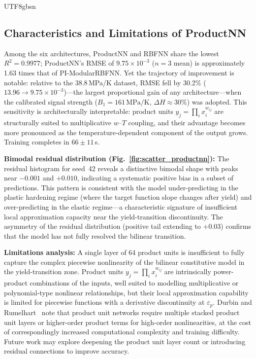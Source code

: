\documentclass[a4paper,12pt]{report}
\begin{document}
\begin{CJK}{UTF8}{gbsn}
\subsection{Characteristics and Limitations of ProductNN}
\label{subsec:productnn_analysis}

Among the six architectures, ProductNN and RBFNN share the lowest $R^2 = 0.9977$;
ProductNN's RMSE of $9.75 \times 10^{-3}$ ($n=3$ mean) is approximately 1.63 times
that of PI-ModularRBFNN. Yet the trajectory of improvement is notable: relative to the
38.8\,MPa/K dataset, RMSE fell by 30.2\% ($13.96 \to 9.75 \times 10^{-3}$)---the
largest proportional gain of any architecture---when the calibrated signal strength
($B_1 = 161\,\mathrm{MPa/K}$, $\Delta H \approx 30\%$) was adopted. This sensitivity
is architecturally interpretable: product units $y_j = \prod_i x_i^{w_{ij}}$ are
structurally suited to multiplicative $w$--$T$ coupling, and their advantage becomes
more pronounced as the temperature-dependent component of the output grows. Training
completes in $66 \pm 11$\,s.

\textbf{Bimodal residual distribution (Fig.~\ref{fig:scatter_productnn}):}
The residual histogram for seed~42 reveals a distinctive bimodal shape with peaks near
$-0.001$ and $+0.010$, indicating a systematic positive bias in a subset of predictions.
This pattern is consistent with the model under-predicting in the plastic hardening
regime (where the target function slope changes after yield) and over-predicting in
the elastic regime---a characteristic signature of insufficient local approximation
capacity near the yield-transition discontinuity. The asymmetry of the residual
distribution (positive tail extending to $+0.03$) confirms that the model has not
fully resolved the bilinear transition.

\textbf{Limitations analysis:} A single layer of 64 product units is insufficient to
fully capture the complex piecewise nonlinearity of the bilinear constitutive model in
the yield-transition zone. Product units $y_j = \prod_i x_i^{w_{ij}}$ are intrinsically
power-product combinations of the inputs, well suited to modelling multiplicative or
polynomial-type nonlinear relationships, but their local approximation capability is
limited for piecewise functions with a derivative discontinuity at $\varepsilon_p$.
Durbin and Rumelhart~\cite{durbin1989} note that product unit networks require multiple
stacked product unit layers or higher-order product terms for high-order nonlinearities,
at the cost of correspondingly increased computational complexity and training difficulty.
Future work may explore deepening the product unit layer count or introducing residual
connections to improve accuracy.


\end{CJK}
\end{document}
